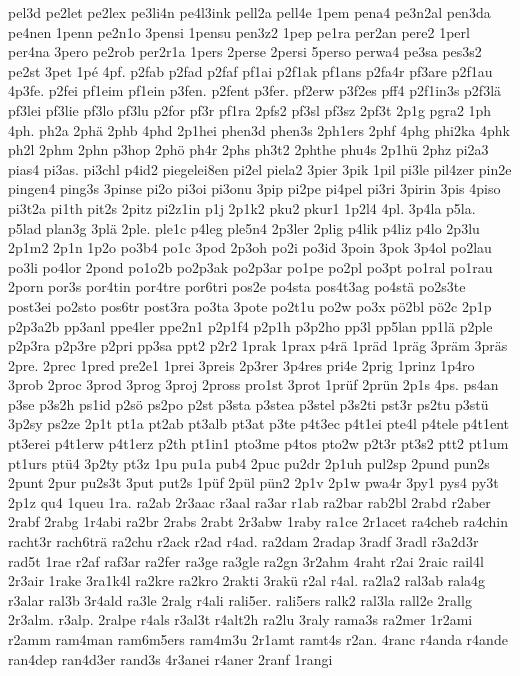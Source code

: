 {pel3d
pe2let
pe2lex
pe3li4n
pe4l3ink
pell2a
pell4e
1pem
pena4
pe3n2al
pen3da
pe4nen
1penn
pe2n1o
3pensi
1pensu
pen3z2
1pep
pe1ra
per2an
pere2
1perl
per4na
3pero
pe2rob
per2r1a
1pers
2perse
2persi
5perso
perwa4
pe3sa
pes3s2
pe2st
3pet
1pé
4pf.
p2fab
p2fad
p2faf
pf1ai
p2f1ak
pf1ans
p2fa4r
pf3are
p2f1au
4p3fe.
p2fei
pf1eim
pf1ein
p3fen.
p2fent
p3fer.
pf2erw
p3f2es
pff4
p2f1in3s
p2f3lä
pf3lei
pf3lie
pf3lo
pf3lu
p2for
pf3r
pf1ra
2pfs2
pf3sl
pf3sz
2pf3t
2p1g
pgra2
1ph
4ph.
ph2a
2phä
2phb
4phd
2p1hei
phen3d
phen3s
2ph1ers
2phf
4phg
phi2ka
4phk
ph2l
2phm
2phn
p3hop
2phö
ph4r
2phs
ph3t2
2phthe
phu4s
2p1hü
2phz
pi2a3
pias4
pi3as.
pi3chl
p4id2
piegelei8en
pi2el
piela2
3pier
3pik
1pil
pi3le
pil4zer
pin2e
pingen4
ping3s
3pinse
pi2o
pi3oi
pi3onu
3pip
pi2pe
pi4pel
pi3ri
3pirin
3pis
4piso
pi3t2a
pi1th
pit2s
2pitz
pi2z1in
p1j
2p1k2
pku2
pkur1
1p2l4
4pl.
3p4la
p5la.
p5lad
plan3g
3plä
2ple.
ple1c
p4leg
ple5n4
2p3ler
2plig
p4lik
p4liz
p4lo
2p3lu
2p1m2
2p1n
1p2o
po3b4
po1c
3pod
2p3oh
po2i
po3id
3poin
3pok
3p4ol
po2lau
po3li
po4lor
2pond
po1o2b
po2p3ak
po2p3ar
po1pe
po2pl
po3pt
po1ral
po1rau
2porn
por3s
por4tin
por4tre
por6tri
pos2e
po4sta
pos4t3ag
po4stä
po2s3te
post3ei
po2sto
pos6tr
post3ra
po3ta
3pote
po2t1u
po2w
po3x
pö2bl
pö2c
2p1p
p2p3a2b
pp3anl
ppe4ler
ppe2n1
p2p1f4
p2p1h
p3p2ho
pp3l
pp5lan
pp1lä
p2ple
p2p3ra
p2p3re
p2pri
pp3sa
ppt2
p2r2
1prak
1prax
p4rä
1präd
1präg
3präm
3präs
2pre.
2prec
1pred
pre2e1
1prei
3preis
2p3rer
3p4res
pri4e
2prig
1prinz
1p4ro
3prob
2proc
3prod
3prog
3proj
2pross
pro1st
3prot
1prüf
2prün
2p1s
4ps.
ps4an
p3se
p3s2h
ps1id
p2sö
ps2po
p2st
p3sta
p3stea
p3stel
p3s2ti
pst3r
ps2tu
p3stü
3p2sy
ps2ze
2p1t
pt1a
pt2ab
pt3alb
pt3at
p3te
p4t3ec
p4t1ei
pte4l
p4tele
p4t1ent
pt3erei
p4t1erw
p4t1erz
p2th
pt1in1
pto3me
p4tos
pto2w
p2t3r
pt3s2
ptt2
pt1um
pt1urs
ptü4
3p2ty
pt3z
1pu
pu1a
pub4
2puc
pu2dr
2p1uh
pul2sp
2pund
pun2s
2punt
2pur
pu2s3t
3put
put2s
1püf
2pül
pün2
2p1v
2p1w
pwa4r
3py1
pys4
py3t
2p1z
qu4
1queu
1ra.
ra2ab
2r3aac
r3aal
ra3ar
r1ab
ra2bar
rab2bl
2rabd
r2aber
2rabf
2rabg
1r4abi
ra2br
2rabs
2rabt
2r3abw
1raby
ra1ce
2r1acet
ra4cheb
ra4chin
racht3r
rach6trä
ra2chu
r2ack
r2ad
r4ad.
ra2dam
2radap
3radf
3radl
r3a2d3r
rad5t
1rae
r2af
raf3ar
ra2fer
ra3ge
ra3gle
ra2gn
3r2ahm
4raht
r2ai
2raic
rail4l
2r3air
1rake
3ra1k4l
ra2kre
ra2kro
2rakti
3rakü
r2al
r4al.
ra2la2
ral3ab
rala4g
r3alar
ral3b
3r4ald
ra3le
2ralg
r4ali
rali5er.
rali5ers
ralk2
ral3la
rall2e
2rallg
2r3alm.
r3alp.
2ralpe
r4als
r3al3t
r4alt2h
ra2lu
3raly
rama3s
ra2mer
1r2ami
r2amm
ram4man
ram6m5ers
ram4m3u
2r1amt
ramt4s
r2an.
4ranc
r4anda
r4ande
ran4dep
ran4d3er
rand3s
4r3anei
r4aner
2ranf
1rangi
}
